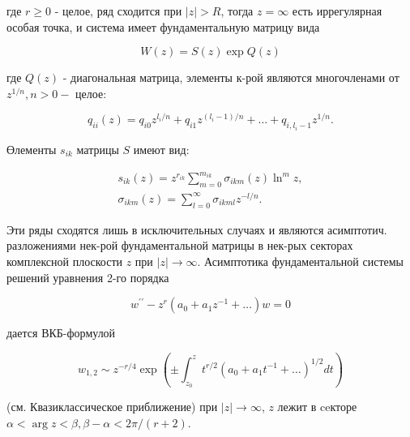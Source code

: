 \documentclass[10pt]{article}
\begin{document}
где $r \geqslant 0$ - целое, ряд сходится при $|z|>R$, тогда $z=\infty$ есть иррегулярная особая точка, и система имеет фундаментальную матрицу вида



\[

W(z)=S(z) \exp Q(z)

\]



где $Q(z)$ - диагональная матрица, элементы к-рой являются многочленами от $z^{1 / n}, n>0-$ целое:



\[

q_{i i}(z)=q_{i 0} z^{l_{i} / n}+q_{i 1} z^{\left(l_{i}-1\right) / n}+\ldots+q_{i, l_{i}-1} z^{1 / n} .

\]



Өлементы $s_{i k}$ матрицы $S$ имеют вид:



\[

\begin{gathered}

s_{i k}(z)=z^{r_{i k}} \sum_{m=0}^{m_{i k}} \sigma_{i k m}(z) \ln ^{m} z, \\

\sigma_{i k m}(z)=\sum_{l=0}^{\infty} \sigma_{i k m l} z^{-l / n} .

\end{gathered}

\]



Эти ряды сходятся лишь в исключительных случаях и являются асимптотич. разложениями нек-рой фундаментальной матрицы в нек-рых секторах комплексной плоскости $z$ при $|z| \rightarrow \infty$. Асимптотика фундаментальной системы решений уравнения 2-го порядка



\[

w^{\prime \prime}-z^{r}\left(a_{0}+a_{1} z^{-1}+\ldots\right) w=0

\]



дается ВКБ-формулой



\[

w_{1,2} \sim z^{-r / 4} \exp \left( \pm \int_{z_{0}}^{z} t^{r / 2}\left(a_{0}+a_{1} t^{-1}+\ldots\right)^{1 / 2} d t\right)

\]



(см. Квазиклассическое приближение) при $|z| \rightarrow \infty$, $z$ лежит в ceкторе $\alpha<\arg z<\beta, \beta-\alpha<2 \pi /(r+2)$.
\end{document}
